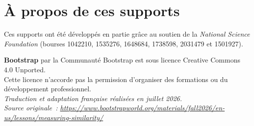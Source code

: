 \documentclass[12pt,a4paper]{article}
\begin{document}
\section*{À propos de ces supports}

Ces supports ont été développés en partie grâce au soutien de la \emph{National Science Foundation} (bourses 1042210, 1535276, 1648684, 1738598, 2031479 et 1501927).

\begin{center}
  \textbf{Bootstrap} par la Communauté Bootstrap est sous licence Creative Commons 4.0 Unported.\\
  Cette licence n'accorde pas la permission d'organiser des formations ou du développement professionnel.\\[1em]
  \textit{Traduction et adaptation française réalisées en juillet 2026.}\\
  \textit{Source originale~: \url{https://www.bootstrapworld.org/materials/fall2026/en-us/lessons/measuring-similarity/}}
\end{center}
\end{document}
